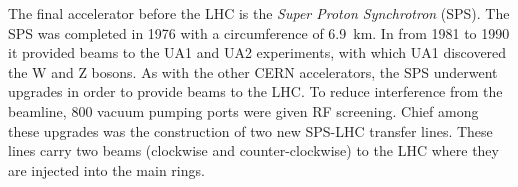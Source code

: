 The final accelerator before the LHC is the \emph{Super Proton Synchrotron} (SPS).
The SPS was completed in 1976 with a circumference of 6.9~km.
In from 1981 to 1990 it provided beams to the UA1 and UA2 experiments, with which UA1 discovered the W and Z bosons.
As with the other CERN accelerators, the SPS underwent upgrades in order to provide beams to the LHC.
To reduce interference from the beamline, 800 vacuum pumping ports were given RF screening. \cite{schindl}
Chief among these upgrades was the construction of two new SPS-LHC transfer lines.
These lines carry two beams (clockwise and counter-clockwise) to the LHC where they are injected into the main rings.

